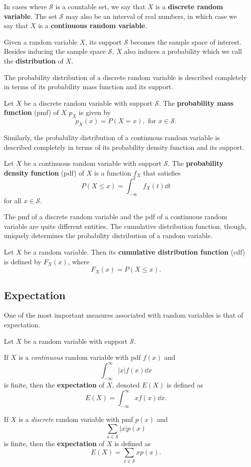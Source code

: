 In cases where $\mathcal S$ is a countable set, we say that $X$ is a \textbf{discrete random variable}. The set $\mathcal S$ may also be an interval of real numbers, in which case we say that $X$ is a \textbf{continuous random variable}.

Given a random variable $X$, its support $\mathcal S$ becomes the sample space of interest. Besides inducing the sample space $\mathcal S$, $X$ also induces a probability which we call the \textbf{distribution} of $X$.

The probability distribution of a discrete random variable is described completely in terms of its probability mass function and its support.

\begin{definition}[pmf]
	Let $X$ be a discrete random variable with support $\mathcal S$. The \textbf{probability mass function} (pmf) of $X$ $p_X$ is given by
$$p_X(x) = P(X = x),\text{ for }x \in \mathcal S.$$
\end{definition}

Similarly, the probability distribution of a continuous random variable is described completely in terms of its probability density function and its support.

\begin{definition}[pdf]
	Let $X$ be a continuous random variable with support $\mathcal S$. The \textbf{probability density function} (pdf) of $X$ is a function $f_X$ that satisfies
$$P(X\leq x)=\int_{-\infty}^xf_X(t)\dd t$$
for all $x\in\mathcal S$.
\end{definition}

The pmf of a discrete random variable and the pdf of a continuous random variable are quite different entities. The cumulative distribution function, though, uniquely determines the probability distribution of a random variable.

\begin{definition}[cdf]
	Let $X$ be a random variable. Then its \textbf{cumulative distribution function} (cdf) is defined by $F_X(x)$, where
$$F_X(x)=P(X\leq x).$$
\end{definition}

\subsection{Expectation}

One of the most important measures associated with random variables is that of expectation.

\begin{definition}[expectation]
	Let $X$ be a random variable with support $\mathcal S$.

	If $X$ is a \textit{continuous} random variable with pdf $f(x)$ and
	$$\int_{-\infty}^{\infty}|x|f(x)\dd x$$
	is finite, then the \textbf{expectation} of $X$, denoted $E(X)$ is defined as
	$$E(X)=\int_{-\infty}^{\infty} xf(x)\dd x.$$ 

	If $X$ is a \textit{discrete} random variable with pmf $p(x)$ and
	$$\sum_{x\in\mathcal S}|x|p(x)$$
	is finite, then the \textbf{expectation} of $X$ is defined as
	$$E(X)=\sum_{x\in\mathcal S}xp(x).$$
\end{definition}

